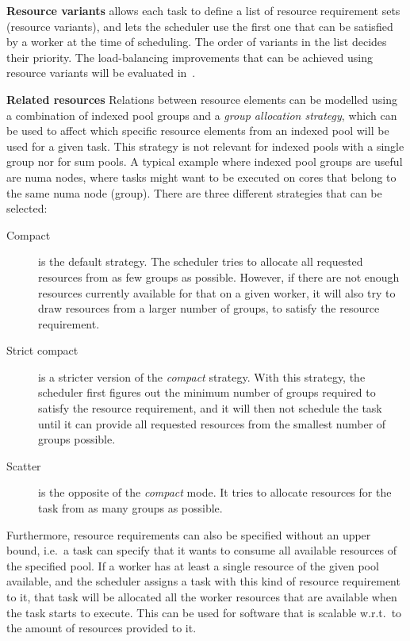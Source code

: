 \textbf{Resource variants} \hyperqueue{} allows each task to define a list of resource
requirement sets (resource variants), and lets the scheduler use the first one that can be
satisfied by a worker at the time of scheduling. The order of variants in the list decides their
priority. The load-balancing improvements that can be achieved
using resource variants will be evaluated in~.

\textbf{Related resources}
Relations between resource elements can be modelled using a combination of indexed pool
groups and a \emph{group allocation strategy}, which can be used to affect which specific
resource elements from an indexed pool will be used for a given task. This strategy is not
relevant for indexed pools with a single group nor for sum pools. A
typical example where indexed pool groups are useful are \gls{numa} nodes, where tasks
might want to be executed on cores that belong to the same \gls{numa} node (group). There are three
different strategies that can be selected:
\begin{description}
	\item [Compact] is the default strategy. The scheduler tries to allocate all requested
	      resources from as few groups as possible. However, if there are not enough resources currently
	      available for that on a given worker, it will also try to draw resources from a larger number of
	      groups, to satisfy the resource requirement.
	\item [Strict compact] is a stricter version of the \emph{compact} strategy. With this
	      strategy, the scheduler first figures out the minimum number of groups required to satisfy the
	      resource requirement, and it will then not schedule the task until it can provide all requested
	      resources from the smallest number of groups possible.
	\item [Scatter] is the opposite of the \emph{compact} mode. It tries to allocate resources
	      for the task from as many groups as possible.
\end{description}

Furthermore, resource requirements can also be specified without an upper bound, i.e.\ a task can
specify that it wants to consume all available resources of the specified pool. If a worker has at least a
single resource of the given pool available, and the scheduler assigns a task with this kind of
resource requirement to it, that task will be allocated all the worker resources that are available
when the task starts to execute. This can be used for software that is scalable w.r.t.\ to the
amount of resources provided to it.


